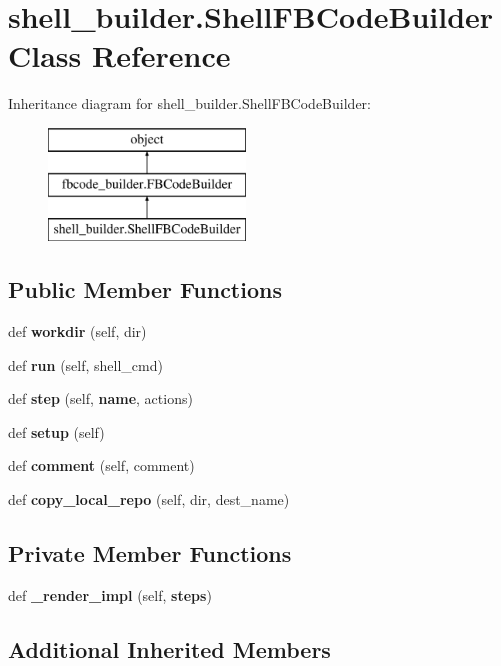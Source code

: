 \section{shell\+\_\+builder.\+Shell\+F\+B\+Code\+Builder Class Reference}
\label{classshell__builder_1_1ShellFBCodeBuilder}
Inheritance diagram for shell\+\_\+builder.\+Shell\+F\+B\+Code\+Builder\+:\begin{figure}[H]
\begin{center}
\leavevmode
\includegraphics[height=3.000000cm]{classshell__builder_1_1ShellFBCodeBuilder}
\end{center}
\end{figure}
\subsection*{Public Member Functions}
\begin{DoxyCompactItemize}
\item 
def {\bf workdir} (self, dir)
\item 
def {\bf run} (self, shell\+\_\+cmd)
\item 
def {\bf step} (self, {\bf name}, actions)
\item 
def {\bf setup} (self)
\item 
def {\bf comment} (self, comment)
\item 
def {\bf copy\+\_\+local\+\_\+repo} (self, dir, dest\+\_\+name)
\end{DoxyCompactItemize}
\subsection*{Private Member Functions}
\begin{DoxyCompactItemize}
\item 
def {\bf \+\_\+render\+\_\+impl} (self, {\bf steps})
\end{DoxyCompactItemize}
\subsection*{Additional Inherited Members}


